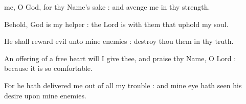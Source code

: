 
 me, O God, for thy Name's sake : and avenge me in thy strength.\par
{}
Behold, God is my helper : the Lord is with them that uphold my soul.\par
{}He shall reward evil unto mine enemies : destroy thou them in thy truth.\par
{}An offering of a free heart will I give thee, and praise thy Name, O Lord : because it is so comfortable.\par
{}For he hath delivered me out of all my trouble : and mine eye hath seen his desire upon mine enemies.\par


